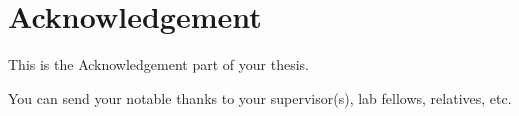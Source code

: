 \thispagestyle{plain}
\chapter*{\hfill \normalsize{Acknowledgement} \hfill}

This is the Acknowledgement part of your thesis.

You can send your notable thanks to your supervisor(s), lab fellows, relatives, etc.


\vfill
